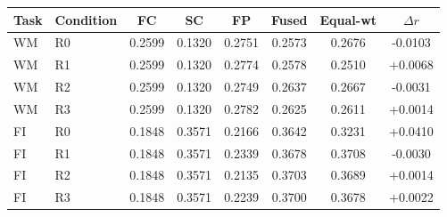 \begin{tabular}{llcccccc}
\toprule
Task & Condition & FC & SC & FP & Fused & Equal-wt & $\Delta r$ \\
\midrule
WM & R0 & 0.2599 & 0.1320 & 0.2751 & 0.2573 & 0.2676 & -0.0103 \\
WM & R1 & 0.2599 & 0.1320 & 0.2774 & 0.2578 & 0.2510 & +0.0068 \\
WM & R2 & 0.2599 & 0.1320 & 0.2749 & 0.2637 & 0.2667 & -0.0031 \\
WM & R3 & 0.2599 & 0.1320 & 0.2782 & 0.2625 & 0.2611 & +0.0014 \\
\midrule
FI & R0 & 0.1848 & 0.3571 & 0.2166 & 0.3642 & 0.3231 & +0.0410 \\
FI & R1 & 0.1848 & 0.3571 & 0.2339 & 0.3678 & 0.3708 & -0.0030 \\
FI & R2 & 0.1848 & 0.3571 & 0.2135 & 0.3703 & 0.3689 & +0.0014 \\
FI & R3 & 0.1848 & 0.3571 & 0.2239 & 0.3700 & 0.3678 & +0.0022 \\
\bottomrule
\end{tabular}